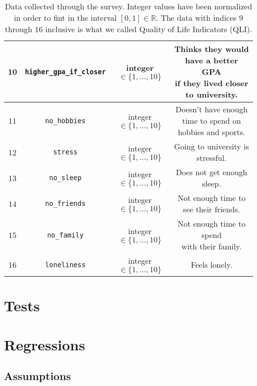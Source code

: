\documentclass[11pt]{extarticle}
\numberwithin{table}{section}
\numberwithin{figure}{section}
\newcommand{\R}{\mathds{R}}
\numberwithin{equation}{section}
\begin{document}
\begin{table}[!ht]
\begin{center}
\begin{tabular}{|c|c|c|c|}
			\hline
			10         & \texttt{higher\_gpa\_if\_closer} & integer $\in \{1, \dots, 10\}$ & \makecell{Thinks they would have a better GPA  \\ if they lived closer to university.} \\
			\hline
			11         & \texttt{no\_hobbies}             & integer $\in \{1, \dots, 10\}$ & \makecell{Doesn't have enough time to spend on \\ hobbies and sports.} \\
			\hline
			12         & \texttt{stress}                  & integer $\in \{1, \dots, 10\}$ & Going to university is stressful.              \\
			\hline
			13         & \texttt{no\_sleep}               & integer $\in \{1, \dots, 10\}$ & Does not get enough sleep.                     \\
			\hline
			14         & \texttt{no\_friends}             & integer $\in \{1, \dots, 10\}$ & Not enough time to see their friends.          \\
			\hline
			15         & \texttt{no\_family}              & integer $\in \{1, \dots, 10\}$ & \makecell{Not enough time to spend             \\ with their family.}    \\
			\hline
			16         & \texttt{loneliness}              & integer $\in \{1, \dots, 10\}$ & Feels lonely.                                  \\
			\hline
		\end{tabular}
		\caption{
			Data collected through the survey.
			Integer values have been normalized in order to fint in the interval $[0,1] \in \R$.
			The data with indices $9$ through $16$ inclusive is what we called Quality of Life Indicators (QLI).
		}
	\end{center}
	\label{table:data}
\end{table}

\section{Tests}

\section{Regressions}

\subsection{Assumptions}
\end{document}
